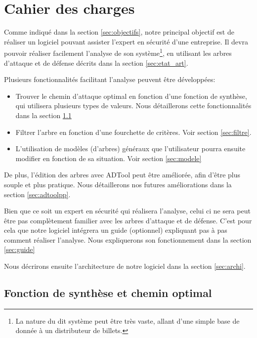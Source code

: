\section{Cahier des charges}
    \label{sec:cahier}


    Comme indiqué dans la section \ref{sec:objectifs}, notre principal objectif est de réaliser un logiciel pouvant assister l'expert en sécurité d'une entreprise. Il devra pouvoir réaliser facilement l'analyse de son système\footnote{La nature du dit système peut être très vaste, allant d'une simple base de donnée à un distributeur de billets.}, en utilisant les arbres d'attaque et de défense décrits dans la section \ref{sec:etat_art}.

    Plusieurs fonctionnalités facilitant l'analyse peuvent être développées:
    \begin{itemize}
        \item Trouver le chemin d'attaque optimal en fonction d'une fonction de synthèse, qui utilisera plusieurs types de valeurs. Nous détaillerons cette fonctionnalités dans la section \ref{sec:fct_synth}
        \item Filtrer l'arbre en fonction d'une fourchette de critères. Voir section \ref{sec:filtre}.
        \item L'utilisation de modèles (d'arbres) généraux que l'utilisateur pourra ensuite modifier en fonction de sa situation. Voir section \ref{sec:modele}
    \end{itemize}

    De plus, l'édition des arbres avec ADTool peut être améliorée, afin d'être plus souple et plus pratique. Nous détaillerons nos futures améliorations dans la section \ref{sec:adtoolpp}.

    Bien que ce soit un expert en sécurité qui réalisera l'analyse, celui ci ne sera peut être pas complètement familier avec les arbres d'attaque et de défense. C'est pour cela que notre logiciel intégrera un guide (optionnel) expliquant pas à pas comment réaliser l'analyse. Nous expliquerons son fonctionnement dans la section \ref{sec:guide}

    Nous décrirons ensuite l'architecture de notre logiciel dans la section \ref{sec:archi}.

    \subsection{Fonction de synthèse et chemin optimal}
        \label{sec:fct_synth}

